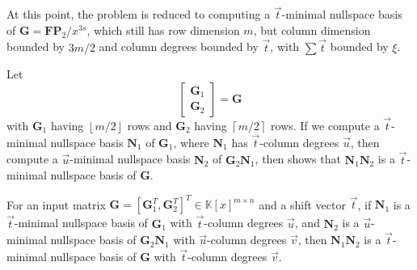 At this point, the problem is reduced to computing a $\vec{t}$-minimal
nullspace basis of $\mathbf{G}=\mathbf{F}\mathbf{P}_{2}/x^{3s}$,
which still has row dimension $m$, but column dimension bounded by
$3m/2$ and column degrees bounded by $\vec{t}$, with $\sum\vec{t}$
bounded by $\xi$.

Let 
\[
\left[\begin{array}{c}
\mathbf{G}_{1}\\
\mathbf{G}_{2}
\end{array}\right]=\mathbf{G}
\]
 with $\mathbf{G}_{1}$ having $\left\lfloor m/2\right\rfloor $ rows
and $\mathbf{G}_{2}$ having $\left\lceil m/2\right\rceil $ rows.
If we compute a $\vec{t}$-minimal nullspace basis $\mathbf{N}_{1}$
of $\mathbf{G}_{1}$, where $\mathbf{N}_{1}$ has $\vec{t}$-column
degrees $\vec{u}$, then compute a $\vec{u}$-minimal nullspace basis
$\mathbf{N}_{2}$ of $\mathbf{G}_{2}\mathbf{N}_{1}$, then 
shows that $\mathbf{N}_{1}\mathbf{N}_{2}$ is a $\vec{t}$-minimal
nullspace basis of $\mathbf{G}$. 
\begin{lem}
\label{lem:continueComputingNullspaceBasisByRows}For an input matrix
$\mathbf{G}=\left[\mathbf{G}_{1}^{T},\mathbf{G}_{2}^{T}\right]^{T}\in\mathbb{K}\left[x\right]^{m\times n}$
and a shift vector $\vec{t}$, if $\mathbf{N}_{1}$ is a $\vec{t}$-minimal
nullspace basis of $\mathbf{G}_{1}$ with $\vec{t}$-column degrees
$\vec{u}$, and $\mathbf{N}_{2}$ is a $\vec{u}$-minimal nullspace
basis of $\mathbf{G}_{2}\mathbf{N}_{1}$ with $\vec{u}$-column degrees
$\vec{v}$, then $\mathbf{N}_{1}\mathbf{N}_{2}$ is a $\vec{t}$-minimal
nullspace basis of $\mathbf{G}$ with $\vec{t}$-column degrees $\vec{v}$.\end{lem}
